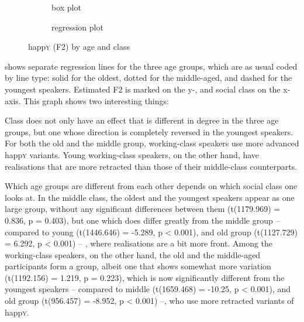 \begin{figure}
	
	\begin{subfigure}{.49\textwidth}
		
			\resizebox{\linewidth}{!}{} 
		\caption{box plot}
		\label{fig.box.f2w.happy.ageclass}
	\end{subfigure}
	\begin{subfigure}{.49\textwidth}
		
			\resizebox{\linewidth}{!}{} 
		\caption{regression plot}
		\label{fig.scatter.f2w.happy.ageclass}
	\end{subfigure}
	\caption{happ\textsc{y} (F2) by age and class}
\end{figure}

 shows separate regression lines for the three age groups, which are as usual coded by line type: solid for the oldest, dotted for the middle-aged, and dashed for the youngest speakers.
Estimated F2 is marked on the y-, and social class on the x-axis.
This graph shows two interesting things:
\begin{inparaenum}[(1)]
	\item Class does not only have an effect that is different in degree in the three age groups, but one whose direction is completely reversed in the youngest speakers.
	For both the old and the middle group, working-class speakers use more advanced happ\textsc{y} variants.
	Young working-class speakers, on the other hand, have realisations that are more retracted than those of their middle-class counterparts.
	\item Which age groups are different from each other depends on which social class one looks at.
	In the middle class, the oldest and the youngest speakers appear as one large group, without any significant differences between them (t(1179.969) = 0.836, p = 0.403), but one which does differ greatly from the middle group -- compared to young (t(1446.646) = -5.289, p < 0.001), and old group (t(1127.729) = 6.292, p < 0.001) -- , where realisations are a bit more front.
	Among the working-class speakers, on the other hand, the old and the middle-aged participants form a group, albeit one that shows somewhat more variation (t(1192.156) = 1.219, p = 0.223), which is now significantly different from the youngest speakers -- compared to middle (t(1659.468) = -10.25, p < 0.001), and old group (t(956.457) = -8.952, p < 0.001) --, who use more retracted variants of happ\textsc{y}.
\end{inparaenum}

